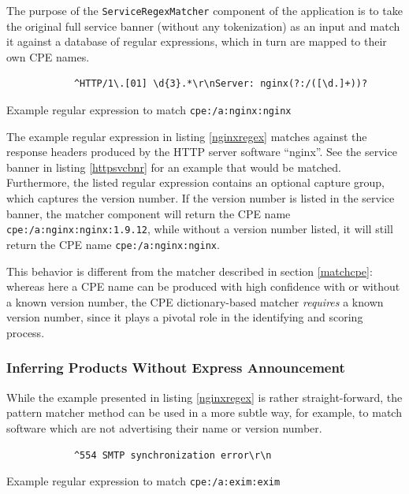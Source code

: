 \documentclass[a4paper,12pt]{article}
\begin{document}
	The purpose of the \texttt{ServiceRegexMatcher} component of the application is to take the original full service banner (without any tokenization) as an input and match it against a database of regular expressions, which in turn are mapped to their own CPE names.

	\begin{listing}[H]
		\begin{verbatim}
			^HTTP/1\.[01] \d{3}.*\r\nServer: nginx(?:/([\d.]+))?
		\end{verbatim}
		\caption{Example regular expression to match \texttt{cpe:/a:nginx:nginx}}
		\label{nginxregex}
	\end{listing}
	
	The example regular expression in listing \ref{nginxregex} matches against the response headers produced by the HTTP server software ``nginx''. See the service banner in listing \ref{httpsvcbnr} for an example that would be matched. Furthermore, the listed regular expression contains an optional capture group, which captures the version number. If the version number is listed in the service banner, the matcher component will return the CPE name \texttt{cpe:/a:nginx:nginx:1.9.12}, while without a version number listed, it will still return the CPE name \texttt{cpe:/a:nginx:nginx}.
	
	This behavior is different from the matcher described in section \ref{matchcpe}: whereas here a CPE name can be produced with high confidence with or without a known version number, the CPE dictionary-based matcher \textit{requires} a known version number, since it plays a pivotal role in the identifying and scoring process.
	
\subsubsection{Inferring Products Without Express Announcement}
 
	
	While the example presented in listing \ref{nginxregex} is rather straight-forward, the pattern matcher method can be used in a more subtle way, for example, to match software which are not advertising their name or version number.
	
	\begin{listing}[H]
		\begin{verbatim}
			^554 SMTP synchronization error\r\n
		\end{verbatim}
		\caption{Example regular expression to match \texttt{cpe:/a:exim:exim}}
		\label{eximregex}
	\end{listing}
	
\end{document}
